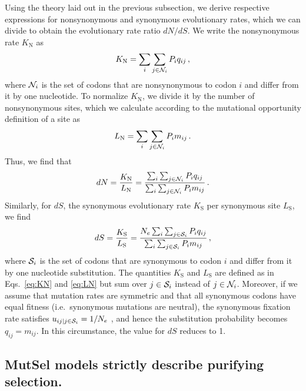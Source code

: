 \documentclass[11pt]{article}
\begin{document}
Using the theory laid out in the previous subsection, we derive respective expressions for nonsynonymous and synonymous evolutionary rates, which we can divide to obtain the evolutionary rate ratio $dN/dS$. We write the nonsynonymous rate $K_\text{N}$ as 
\begin{equation}\label{eq:KN}
	K_\text{N} = \sum_i \sum_{j \in {\cal N}_i} P_i q_{ij} \,,
\end{equation}
where ${\cal N}_i$ is the set of codons that are nonsynonymous to codon $i$ and differ from it by one nucleotide. To normalize $K_\text{N}$, we divide it by the number of nonsynonymous sites, which we calculate according to the mutational opportunity definition of a site \cite{GoldmanYang1994, Yang2006} as 
\begin{equation}\label{eq:LN}
	L_\text{N} = \sum_i \sum_{j \in {\cal N}_i} P_i m_{ij}\, .
\end{equation} Thus, we find that 
\begin{equation}\label{eq:dN}
	dN = \frac{K_\text{N}}{L_\text{N}}=\frac{\sum_i \sum_{j \in {\cal N}_i} P_i q_{ij}} {\sum_i \sum_{j \in {\cal N}_i}P_i m_{ij}}\,.
\end{equation} Similarly, for $dS$, the synonymous evolutionary rate $K_\text{S}$ per synonymous site $L_\text{S}$, we find
\begin{equation}\label{eq:dS}
	dS = \frac{K_\text{S}}{L_\text{S}}=\frac{ N_e \sum_i \sum_{j \in {\cal S}_i} P_i q_{ij} } {\sum_i \sum_{j \in {\cal S}_i} P_i m_{ij} }\,,
\end{equation}
where ${\cal S}_i$ is the set of codons that are synonymous to codon $i$ and differ from it by one nucleotide substitution. The quantities $K_\text{S}$ and $L_\text{S}$ are defined as in Eqs.~\eqref{eq:KN} and \eqref{eq:LN} but sum over $j\in {\cal S}_i$ instead of $j\in {\cal N}_i$. Moreover, if we assume that mutation rates are symmetric and that all synonymous codons have equal fitness (i.e.\ synonymous mutations are neutral), the synonymous fixation rate satisfies $u_{ij | j \in {\cal S}_i} = 1/N_e$ \cite{CrowKimura1970}, and hence the substitution probability becomes $q_{ij} = m_{ij}$. In this circumstance, the value for $dS$ reduces to 1.
		
				
\subsection*{MutSel models strictly describe purifying selection.}
\end{document}
